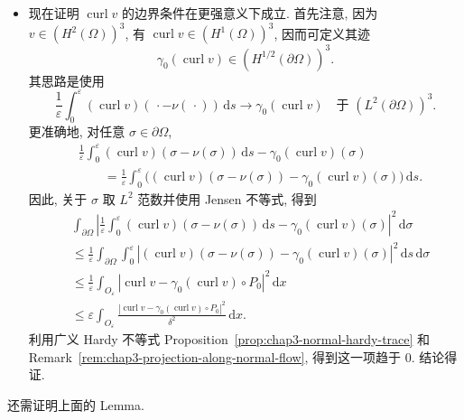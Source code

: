 \begin{Proof}
\begin{itemize}
\item 现在证明 $\operatorname{curl}v$ 的边界条件在更强意义下成立. 首先注意, 因为 $v\in(H^2(\Omega))^3$, 有 $\operatorname{curl}v\in(H^1(\Omega))^3$, 因而可定义其迹
\[
 \gamma_0(\operatorname{curl}v)\in(H^{1/2}(\partial\Omega))^3.
\]
其思路是使用
\[
 \frac1\varepsilon\int_0^\varepsilon
 (\operatorname{curl}v)(\,\cdot-\nu(\,\cdot))\,\mathrm ds
 \longrightarrow\gamma_0(\operatorname{curl}v)
 \quad\text{于 }(L^2(\partial\Omega))^3.
\]
更准确地, 对任意 $\sigma\in\partial\Omega$,
\begin{align*}
 &\frac1\varepsilon\int_0^\varepsilon
 (\operatorname{curl}v)(\sigma-\nu(\sigma))\,\mathrm ds
 -\gamma_0(\operatorname{curl}v)(\sigma)\\
 &\qquad=\frac1\varepsilon\int_0^\varepsilon
 \bigl((\operatorname{curl}v)(\sigma-\nu(\sigma))
 -\gamma_0(\operatorname{curl}v)(\sigma)\bigr)\,\mathrm ds.
\end{align*}
因此, 关于 $\sigma$ 取 $L^2$ 范数并使用 Jensen 不等式, 得到
\begin{align*}
 &\int_{\partial\Omega}
 \left|\frac1\varepsilon\int_0^\varepsilon
 (\operatorname{curl}v)(\sigma-\nu(\sigma))\,\mathrm ds
 -\gamma_0(\operatorname{curl}v)(\sigma)\right|^2\,\mathrm d\sigma\\
 &\leq\frac1\varepsilon\int_{\partial\Omega}\int_0^\varepsilon
 \left|(\operatorname{curl}v)(\sigma-\nu(\sigma))
 -\gamma_0(\operatorname{curl}v)(\sigma)\right|^2\,\mathrm ds\,\mathrm d\sigma\\
 &\leq\frac1\varepsilon\int_{O_\varepsilon}
 |\operatorname{curl}v-\gamma_0(\operatorname{curl}v)\circ P_0|^2\,\mathrm dx\\
 &\leq\varepsilon\int_{O_\varepsilon}
 \frac{|\operatorname{curl}v-\gamma_0(\operatorname{curl}v)\circ P_0|^2}{\delta^2}\,\mathrm dx.
\end{align*}
利用广义 Hardy 不等式 Proposition~\ref{prop:chap3-normal-hardy-trace} 和 Remark~\ref{rem:chap3-projection-along-normal-flow}, 得到这一项趋于 $0$. 结论得证.
\end{itemize}
\end{Proof}

还需证明上面的 Lemma.

